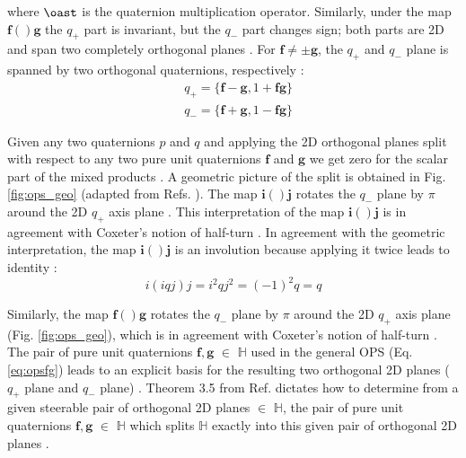 \documentclass[superscriptaddress,longbibliography,aps,prl,twocolumn,10pt]{revtex4-2}
\begin{document}
\noindent
where $\oast$ is the quaternion multiplication operator. Similarly, under the map $\boldsymbol{f}()\boldsymbol{g}$ the $q_{+}$ part is invariant, but the $q_{-}$ part changes sign; both parts are 2D and span two completely orthogonal planes \cite{HitzerSangwine2013, Hitzer2015}. For $\boldsymbol{f} \neq \pm \boldsymbol{g}$, the $q_{+}$ and $q_{-}$ plane is spanned by two orthogonal quaternions, respectively \cite{HitzerSangwine2013, Hitzer2015}:
    \begin{equation} \label{eq:basisfg}
    \begin{aligned}
        &q_{+} = \{\boldsymbol{f}-\boldsymbol{g},1+\boldsymbol{f}\boldsymbol{g} \}\\
        &q_{-} = \{\boldsymbol{f}+\boldsymbol{g},1-\boldsymbol{f}\boldsymbol{g} \}
    \end{aligned}
    \end{equation}

\noindent
Given any two quaternions $p$ and $q$ and applying the 2D orthogonal planes split with respect to any two pure unit quaternions $\boldsymbol{f}$ and $\boldsymbol{g}$ we get zero for the scalar part of the mixed products \cite{HitzerSangwine2013, Hitzer2015}. A geometric picture of the split is obtained in Fig. \ref{fig:ops_geo} (adapted from Refs. \cite{HitzerSangwine2013, Hitzer2015}). The map $\boldsymbol{i}()\boldsymbol{j}$ rotates the $q_{-}$ plane by $\pi$ around the 2D $q_{+}$ axis plane \cite{HitzerSangwine2013, Hitzer2015}. This interpretation of the map $\boldsymbol{i}()\boldsymbol{j}$ is in agreement with Coxeter's notion of half-turn \cite{HitzerSangwine2013, Hitzer2015}. In agreement with the geometric interpretation, the map $\boldsymbol{i}()\boldsymbol{j}$ is an involution because applying it twice leads to identity \cite{HitzerSangwine2013, Hitzer2015}:
    \begin{equation} \label{eq:involution}
        i(iqj)j=i^2qj^2=(-1)^2q=q
    \end{equation}

\noindent
Similarly, the map $\boldsymbol{f}()\boldsymbol{g}$ rotates the $q_{-}$ plane by $\pi$ around the 2D $q_{+}$ axis plane (Fig. \ref{fig:ops_geo}), which is in agreement with Coxeter's notion of half-turn \cite{HitzerSangwine2013, Hitzer2015}. The pair of pure unit quaternions $\boldsymbol{f}, \boldsymbol{g}$ $\in$ $\mathbb{H}$ used in the general OPS (Eq. \ref{eq:opsfg}) leads to an explicit basis for the resulting two orthogonal 2D planes ($q_{+}$ plane and $q_{-}$ plane) \cite{HitzerSangwine2013}. Theorem 3.5 from Ref. \cite{HitzerSangwine2013} dictates how to determine from a given steerable pair of orthogonal 2D planes $\in$ $\mathbb{H}$, the pair of pure unit quaternions $\boldsymbol{f},\boldsymbol{g}$ $\in$ $\mathbb{H}$ which splits $\mathbb{H}$ exactly into this given pair of orthogonal 2D planes \cite{HitzerSangwine2013}.
\end{document}
